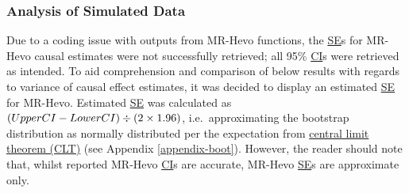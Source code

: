 \documentclass[
]{article}
\begin{document}
\subsubsection{Analysis of Simulated Data}\label{analysis-of-simulated-data-1}

Due to a coding issue with outputs from MR-Hevo functions, the \hyperref[acronyms_SE]{SE}s for MR-Hevo causal estimates were not successfully retrieved; all 95\% \hyperref[acronyms_CI]{CI}s were retrieved as intended. To aid comprehension and comparison of below results with regards to variance of causal effect estimates, it was decided to display an estimated \hyperref[acronyms_SE]{SE} for MR-Hevo. Estimated \hyperref[acronyms_SE]{SE} was calculated as \((Upper \space CI - Lower \space CI) \div (2 \times 1.96)\), i.e.~approximating the bootstrap distribution as normally distributed per the expectation from \hyperref[acronyms_CLT]{central limit theorem (CLT)} (see Appendix \ref{appendix-boot}). However, the reader should note that, whilst reported MR-Hevo \hyperref[acronyms_CI]{CI}s are accurate, MR-Hevo \hyperref[acronyms_SE]{SE}s are approximate only.
\end{document}

